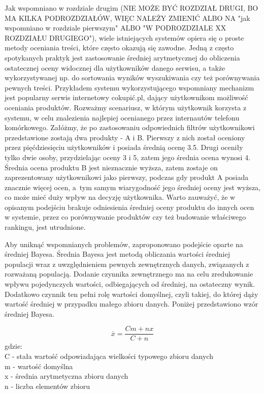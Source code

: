 Jak wspomniano w rozdziale drugim (NIE MOŻE BYĆ ROZDZIAŁ DRUGI, BO MA KILKA PODROZDZIAŁÓW, WIĘC NALEŻY ZMIENIĆ ALBO NA "jak wspomniano w rozdziale pierwszym" ALBO "W PODROZDZIALE XX ROZDZIAŁU DRUGIEGO"), wiele istniejących systemów opiera się o proste metody oceniania treści, które często okazują się zawodne. Jedną z często spotykanych praktyk jest zastosowanie średniej arytmetycznej do obliczenia ostatecznej oceny widocznej dla użytkowników danego serwisu, a także wykorzystywanej np. do sortowania wyników wyszukiwania czy też porównywania pewnych treści. Przykładem systemu wykorzystującego wspomniany mechanizm jest popularny serwis internetowy cokupić.pl, dający użytkownikom możliwość oceniania produktów. Rozważmy scenariusz, w którym użytkownik korzysta z systemu, w celu znalezienia najlepiej ocenianego przez internautów telefonu komórkowego. Załóżmy, że po zastosowaniu odpowiednich filtrów użytkownikowi przedstawione zostają dwa produkty - A i B. Pierwszy z nich został oceniony przez pięćdziesięciu użytkowników i posiada średnią ocenę 3.5. Drugi oceniły tylko dwie osoby, przydzielając oceny 3 i 5, zatem jego średnia ocena wynosi 4. Średnia ocena produktu B jest nieznacznie wyższa, zatem zostaje on zaprezentowany użytkownikowi jako pierwszy, podczas gdy produkt A posiada znacznie więcej ocen, a~tym samym wiarygodność jego średniej oceny jest wyższa, co może mieć duży wpływ na decyzję użytkownika. Warto zauważyć, że w opisanym podejściu brakuje odniesienia średniej oceny produktu do innych ocen w systemie, przez co porównywanie produktów czy też budowanie właściwego rankingu, jest utrudnione.

Aby uniknąć wspomnianych problemów, zaproponowano podejście oparte na średniej Bayesa. Średnia Bayesa jest metodą obliczania wartości średniej populacji wraz z uwzględnieniem pewnych zewnętrznych danych, związanych z rozważaną populacją. Dodanie czynnika zewnętrznego ma na celu zredukowanie wpływu pojedynczych wartości, odbiegających od średniej, na ostateczny wynik. Dodatkowo czynnik ten pełni rolę wartości domyślnej, czyli takiej, do której dąży wartość średniej w przypadku małego zbioru danych.\cite{bayesWiki} Poniżej przedstawiono wzór średniej Bayesa.

\begin{equation}
\bar{x}=\frac{Cm+nx}{C+n}
\end{equation}
gdzie:\\
C - stała wartość odpowiadająca wielkości typowego zbioru danych\\
m - wartość domyślna\\
x - średnia arytmetyczna zbioru danych\\
n - liczba elementów zbioru\\


